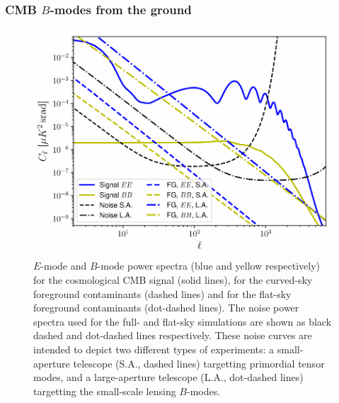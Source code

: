 \documentclass[usenatbib]{mnrasb}
\begin{document}
      \subsubsection{CMB $B$-modes from the ground} \label{sssec:validation.suite.cmb}
        \begin{figure}
          \centering
          \includegraphics[width=0.99\columnwidth]{cls_cmb}
          \caption{$E$-mode and $B$-mode power spectra (blue and yellow respectively) for the cosmological CMB signal (solid lines), for the curved-sky foreground contaminants (dashed lines) and for the flat-sky foreground contaminants (dot-dashed lines). The noise power spectra used for the full- and flat-sky simulations are shown as black dashed and dot-dashed lines respectively. These noise curves are intended to depict two different types of experiments: a small-aperture telescope (S.A., dashed lines) targetting primordial tensor modes, and a large-aperture telescope (L.A., dot-dashed lines) targetting the small-scale lensing $B$-modes.} \label{fig:cmb_cls}
        \end{figure}
\end{document}
